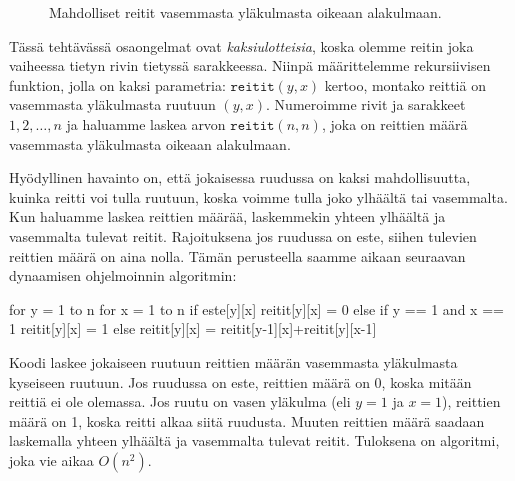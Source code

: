 \begin{figure}
\center
{}
\caption{Mahdolliset reitit vasemmasta yläkulmasta oikeaan alakulmaan.}
\label{fig:reiruu}
\end{figure}

Tässä tehtävässä osaongelmat ovat \emph{kaksiulotteisia},
koska olemme reitin joka vaiheessa tietyn rivin tietyssä sarakkeessa.
Niinpä määritte\-lemme rekursiivisen funktion, jolla on kaksi
parametria: $\texttt{reitit}(y,x)$ kertoo, montako reittiä on
vasemmasta yläkulmasta ruutuun $(y,x)$.
Numeroimme rivit ja sarakkeet $1,2,\dots,n$
ja haluamme laskea arvon $\texttt{reitit}(n,n)$,
joka on reittien määrä vasemmasta yläkulmasta oikeaan alakulmaan.

Hyödyllinen havainto on, että jokaisessa ruudussa on kaksi
mahdollisuutta, kuinka reitti voi tulla ruutuun,
koska voimme tulla joko ylhäältä tai vasemmalta.
Kun haluamme laskea reittien määrää, laskemmekin yhteen ylhäältä
ja vasemmalta tulevat reitit.
Rajoituksena jos ruudussa on este, siihen tulevien reittien
määrä on aina nolla.
Tämän perusteella saamme aikaan seuraavan
dynaamisen ohjelmoinnin algoritmin:

\begin{code}
for y = 1 to n
    for x = 1 to n
        if este[y][x]
            reitit[y][x] = 0
        else if y == 1 and x == 1
            reitit[y][x] = 1
        else
            reitit[y][x] = reitit[y-1][x]+reitit[y][x-1]
\end{code}

Koodi laskee jokaiseen ruutuun reittien määrän
vasemmasta yläkulmasta kyseiseen ruutuun.
Jos ruudussa on este, reittien määrä on 0,
koska mitään reittiä ei ole olemassa.
Jos ruutu on vasen yläkulma (eli $y=1$ ja $x=1$),
reittien määrä on 1, koska reitti alkaa siitä ruudusta.
Muuten reittien määrä saadaan laskemalla yhteen
ylhäältä ja vasemmalta tulevat reitit.
Tuloksena on algoritmi, joka vie aikaa $O(n^2)$.

